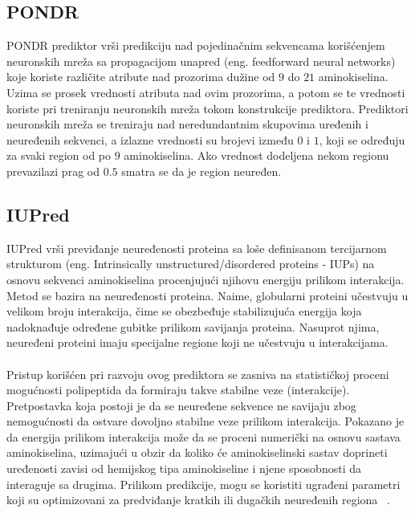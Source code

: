 \subsection{PONDR}
PONDR prediktor vrši predikciju nad pojedinačnim sekvencama korišćenjem neuronskih mreža sa propagacijom unapred (eng. feedforward neural networks) koje koriste različite atribute nad prozorima dužine od $9$ do $21$ aminokiselina. Uzima se prosek vrednosti atributa nad ovim prozorima, a potom se te vrednosti koriste pri treniranju neuronskih mreža tokom konstrukcije prediktora. Prediktori neuronskih mreža se treniraju nad neredundantnim skupovima uređenih i neuređenih sekvenci, a izlazne vrednosti su brojevi između $0$ i $1$, koji se određuju za svaki region od po $9$ aminokiselina. Ako vrednost dodeljena nekom regionu prevazilazi prag od $0.5$ smatra se da je region neuređen.



\subsection{IUPred}
IUPred vrši previđanje neuređenosti proteina sa loše definisanom tercijarnom strukturom (eng. Intrinsically unstructured/disordered proteins - IUPs) na osnovu sekvenci aminokiselina procenjujući njihovu energiju prilikom interakcija. Metod se bazira na neuređenosti proteina. Naime, globularni proteini učestvuju u velikom broju interakcija, čime se obezbeđuje stabilizujuća energija koja nadoknađuje određene gubitke prilikom savijanja proteina. Nasuprot njima, neuređeni proteini imaju specijalne regione koji ne učestvuju u   interakcijama.\\\\

Pristup korišćen pri razvoju ovog prediktora se zasniva na statističkoj proceni mogućnosti polipeptida da formiraju takve stabilne veze (interakcije). Pretpostavka koja postoji je da se neuređene sekvence ne savijaju zbog nemogućnosti da ostvare dovoljno stabilne veze prilikom interakcija. Pokazano  je da energija prilikom interakcija može da se proceni numerički na osnovu sastava aminokiselina, uzimajući u obzir da koliko će aminokiselinski sastav doprineti uređenosti zavisi od hemijskog tipa aminokiseline i njene sposobnosti da interaguje sa drugima. Prilikom predikcije, mogu se koristiti ugrađeni parametri koji su optimizovani za predviđanje kratkih ili dugačkih neuređenih regiona ~\cite{IUPred, IUPred1, IUPred2, IUPred3}.
%
